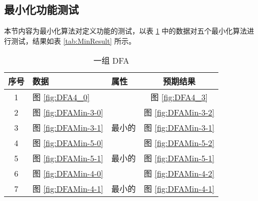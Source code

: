 \subsection{最小化功能测试}

本节内容为最小化算法对定义功能的测试，以表 \ref{tab:MinData} 中的数据对五个最小化算法进行测试，结果如表 \ref{tab:MinResult} 所示。

\begin{table}[!htbp]
    \caption{一组 DFA}
    \label{tab:MinData}
    \centering
    \small%
    \setlength{\tabcolsep}{4pt}%
    \renewcommand{\arraystretch}{1.2}%
    \begin{tabular}{c p{4em}<{\centering} p{4em}<{\centering} c }  %
        \toprule %
                序号  &  数据 & 属性 & 预期结果  \\
        \midrule%
        1 &  图 \ref{fig:DFA4_0} &            & 图 \ref{fig:DFA4_3}\\
        \midrule
        2 & 图 \ref{fig:DFAMin-3-0} &         & 图 \ref{fig:DFAMin-3-2}  \\
        3 & 图 \ref{fig:DFAMin-3-1} & 最小的  & 图 \ref{fig:DFAMin-3-1}  \\
        \midrule
        4 & 图 \ref{fig:DFAMin-5-0} &         & 图 \ref{fig:DFAMin-5-2}  \\
        5 & 图 \ref{fig:DFAMin-5-1} & 最小的  & 图 \ref{fig:DFAMin-5-1}  \\
        \midrule
        6 & 图 \ref{fig:DFAMin-4-0} &        & 图 \ref{fig:DFAMin-4-2}  \\
        7 & 图 \ref{fig:DFAMin-4-1} & 最小的  & 图 \ref{fig:DFAMin-4-1}  \\
        \bottomrule%
    \end{tabular}
\end{table}

